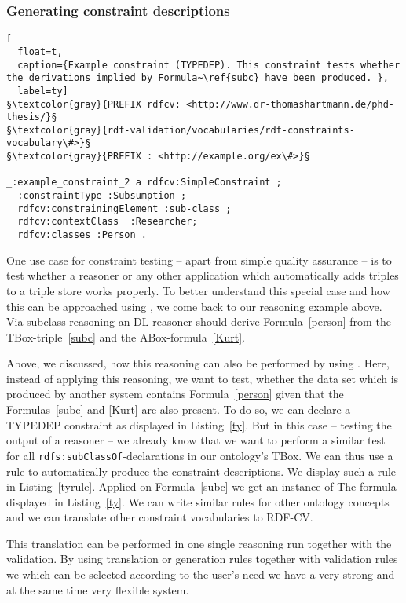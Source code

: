 \subsubsection{Generating constraint descriptions}
\begin{lstlisting}[
  float=t,
  caption={Example constraint (TYPEDEP). This constraint tests whether the derivations implied by Formula~\ref{subc} have been produced. },
  label=ty]
§\textcolor{gray}{PREFIX rdfcv: <http://www.dr-thomashartmann.de/phd-thesis/}§
§\textcolor{gray}{rdf-validation/vocabularies/rdf-constraints-vocabulary\#>}§
§\textcolor{gray}{PREFIX : <http://example.org/ex\#>}§

_:example_constraint_2 a rdfcv:SimpleConstraint ;
  :constraintType :Subsumption ;
  rdfcv:constrainingElement :sub-class ;
  rdfcv:contextClass  :Researcher;
  rdfcv:classes :Person .
\end{lstlisting}
One use case for constraint testing -- apart from simple quality assurance -- is to test whether a reasoner or any other application which automatically 
adds triples to a triple store works properly. 
To better understand this special case and how this can be approached using \nthree, we come back to our reasoning example above. Via subclass reasoning an 
\owl DL reasoner should derive Formula~\ref{person} from the  TBox-triple~\ref{subc} and the ABox-formula~\ref{Kurt}. %

Above, we discussed, how this reasoning can also be performed by using \nthree. Here, instead of applying this reasoning, we want to test, whether the data set 
which is produced by another system contains Formula~\ref{person} given that the Formulas~\ref{subc} and \ref{Kurt} are also present. 
To do so, we can declare a TYPEDEP constraint as displayed in Listing~\ref{ty}. But in this case -- testing the output of a reasoner -- we already know that we want to perform a similar test
for all \texttt{rdfs:subClassOf}-declarations in our ontology's TBox. 
We can thus use a rule to automatically produce the constraint descriptions. We display such a rule in Listing~\ref{tyrule}.
Applied on Formula~\ref{subc} we get an instance of The formula displayed in Listing~\ref{ty}. We can write similar rules for other ontology concepts and we can translate other constraint 
vocabularies to RDF-CV. 

This translation can be performed in one single reasoning run together with the validation. By using translation or generation rules together with validation rules we
which can be selected according to the user's need we have a very strong and at the same time very flexible system.

